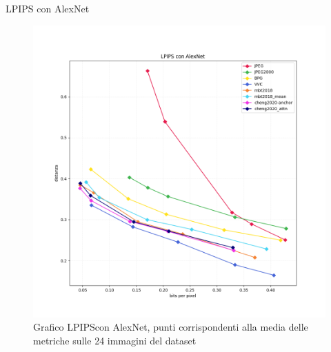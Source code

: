     \begin{frame}{LPIPS con AlexNet}
        \begin{figure}[t!]
            \centering
            \includegraphics[width=0.57\textheight]{Immagini/METRICS/LPIPS.png}
            \caption{Grafico LPIPS\footnotemark[1] con AlexNet, punti corrispondenti alla media delle metriche sulle 24 immagini del dataset}
            \label{fig:GraphLPIPS}
        \end{figure}
    \end{frame}
    
    